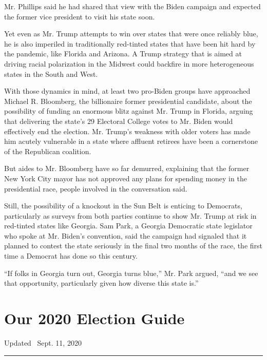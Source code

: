 Mr. Phillips said he had shared that view with the Biden campaign and
expected the former vice president to visit his state soon.

Yet even as Mr. Trump attempts to win over states that were once
reliably blue, he is also imperiled in traditionally red-tinted states
that have been hit hard by the pandemic, like Florida and Arizona. A
Trump strategy that is aimed at driving racial polarization in the
Midwest could backfire in more heterogeneous states in the South and
West.

With those dynamics in mind, at least two pro-Biden groups have
approached Michael R. Bloomberg, the billionaire former presidential
candidate, about the possibility of funding an enormous blitz against
Mr. Trump in Florida, arguing that delivering the state's 29 Electoral
College votes to Mr. Biden would effectively end the election. Mr.
Trump's weakness with older voters has made him acutely vulnerable in a
state where affluent retirees have been a cornerstone of the Republican
coalition.

But aides to Mr. Bloomberg have so far demurred, explaining that the
former New York City mayor has not approved any plans for spending money
in the presidential race, people involved in the conversation said.

Still, the possibility of a knockout in the Sun Belt is enticing to
Democrats, particularly as surveys from both parties continue to show
Mr. Trump at risk in red-tinted states like Georgia. Sam Park, a Georgia
Democratic state legislator who spoke at Mr. Biden's convention, said
the campaign had signaled that it planned to contest the state seriously
in the final two months of the race, the first time a Democrat has done
so this century.

``If folks in Georgia turn out, Georgia turns blue,'' Mr. Park argued,
``and we see that opportunity, particularly given how diverse this state
is.''

\hypertarget{our-2020-election-guide}{%
\section{Our 2020 Election Guide}\label{our-2020-election-guide}}

Updated ~Sept. 11, 2020

\begin{center}\rule{0.5\linewidth}{\linethickness}\end{center}

